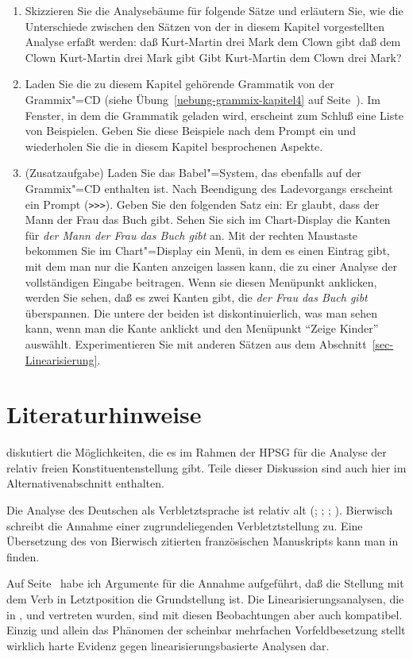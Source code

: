 \begin{enumerate}
\item Skizzieren Sie die Analysebäume für folgende Sätze und erläutern Sie,
      wie die Unterschiede zwischen den Sätzen von der in diesem Kapitel
      vorgestellten Analyse erfaßt werden:
\eal
\ex daß Kurt-Martin drei Mark dem Clown gibt
\ex daß dem Clown Kurt-Martin drei Mark gibt 
\ex Gibt Kurt-Martin dem Clown drei Mark?
\zl

\item Laden Sie die zu diesem Kapitel gehörende Grammatik von der Grammix"=CD
(siehe Übung~\ref{uebung-grammix-kapitel4} auf Seite~\pageref{uebung-grammix-kapitel4}).
Im Fenster, in dem die Grammatik geladen wird, erscheint zum Schluß eine Liste von Beispielen.
Geben Sie diese Beispiele nach dem Prompt ein und wiederholen Sie die in diesem Kapitel besprochenen
Aspekte.

\item (Zusatzaufgabe) Laden Sie das Babel"=System, das ebenfalls auf der Grammix"=CD enthalten ist. 
Nach Beendigung des Ladevorgangs erscheint ein Prompt (\verb+>>>+). Geben Sie den folgenden Satz
ein:
\ea
Er glaubt, dass der Mann der Frau das Buch gibt.
\z
Sehen Sie sich im Chart-Display die Kanten für \emph{der Mann der Frau das Buch gibt} an. Mit der
rechten Maustaste bekommen Sie im Chart"=Display ein Menü, in dem es einen Eintrag gibt, mit dem man
nur die Kanten anzeigen lassen kann, die zu einer Analyse der vollständigen Eingabe beitragen. Wenn
sie diesen Menüpunkt anklicken, werden Sie sehen, daß es zwei Kanten gibt, die \emph{der Frau das
Buch gibt} überspannen. Die untere der beiden ist diskontinuierlich, was man sehen kann, wenn man
die Kante anklickt und den Menüpunkt "`Zeige Kinder"' auswählt. Experimentieren Sie mit anderen Sätzen
aus dem Abschnitt~\ref{sec-Linearisierung}.
\end{enumerate}

\section*{Literaturhinweise}

 diskutiert die Möglichkeiten, die es im Rahmen der HPSG für die Analyse der
relativ freien Konstituentenstellung gibt. Teile dieser Diskussion sind auch hier im
Alternativenabschnitt enthalten.

Die Analyse des Deutschen als Verbletztsprache ist relativ alt (\citealp{Bach62a};
\citealp*[]{Bierwisch63a}; \citealp{Reis74a}; \citealp[Kapitel~1]{Thiersch78a}). Bierwisch
schreibt die Annahme einer zugrundeliegenden Verbletztstellung \citet{Fourquet57a} zu. Eine
Übersetzung des von Bierwisch zitierten französischen Manuskripts kann man in
 finden.

Auf Seite~\pageref{page-verbletzt} habe ich Argumente für die Annahme aufgeführt, daß die Stellung
mit dem Verb in Letztposition die Grundstellung ist. Die Linearisierungsanalysen, die in
,  und  vertreten wurden, sind mit
diesen Beobachtungen aber auch kompatibel. Einzig und allein das Phänomen der scheinbar mehrfachen
Vorfeldbesetzung \citep{Mueller2005d} stellt wirklich harte Evidenz gegen linearisierungsbasierte Analysen dar.

